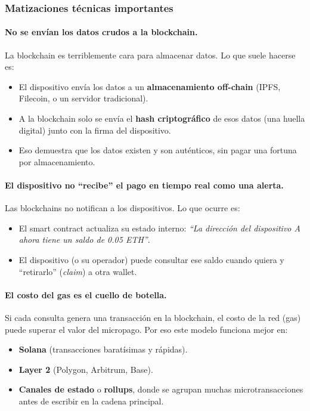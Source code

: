 \documentclass[12pt,a4paper]{article}
\begin{document}
\subsubsection{Matizaciones t\'{e}cnicas importantes}

\paragraph{No se env\'{i}an los datos crudos a la blockchain.}
La blockchain es terriblemente cara para almacenar datos. Lo que suele hacerse es:
\begin{itemize}
    \item El dispositivo env\'{i}a los datos a un \textbf{almacenamiento off-chain} (IPFS, Filecoin, o un servidor tradicional).
    \item A la blockchain solo se env\'{i}a el \textbf{hash criptogr\'{a}fico} de esos datos (una huella digital) junto con la firma del dispositivo.
    \item Eso demuestra que los datos existen y son aut\'{e}nticos, sin pagar una fortuna por almacenamiento.
\end{itemize}

\paragraph{El dispositivo no ``recibe'' el pago en tiempo real como una alerta.}
Las blockchains no notifican a los dispositivos. Lo que ocurre es:
\begin{itemize}
    \item El smart contract actualiza su estado interno: \textit{``La direcci\'{o}n del dispositivo A ahora tiene un saldo de 0.05 ETH''}.
    \item El dispositivo (o su operador) puede consultar ese saldo cuando quiera y ``retirarlo'' (\textit{claim}) a otra wallet.
\end{itemize}

\paragraph{El costo del gas es el cuello de botella.}
Si cada consulta genera una transacci\'{o}n en la blockchain, el costo de la red (gas) puede superar el valor del micropago. Por eso este modelo funciona mejor en:
\begin{itemize}
    \item \textbf{Solana} (transacciones barat\'{i}simas y r\'{a}pidas).
    \item \textbf{Layer 2} (Polygon, Arbitrum, Base).
    \item \textbf{Canales de estado} o \textbf{rollups}, donde se agrupan muchas microtransacciones antes de escribir en la cadena principal.
\end{itemize}
\end{document}
